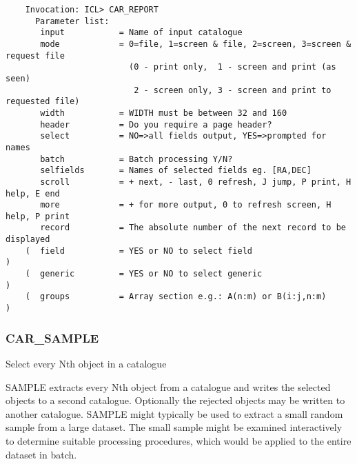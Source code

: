 \begin{verbatim}
    Invocation: ICL> CAR_REPORT
      Parameter list:
       input           = Name of input catalogue
       mode            = 0=file, 1=screen & file, 2=screen, 3=screen & request file
                         (0 - print only,  1 - screen and print (as seen)
                          2 - screen only, 3 - screen and print to requested file)
       width           = WIDTH must be between 32 and 160
       header          = Do you require a page header?
       select          = NO=>all fields output, YES=>prompted for names
       batch           = Batch processing Y/N?
       selfields       = Names of selected fields eg. [RA,DEC]
       scroll          = + next, - last, 0 refresh, J jump, P print, H help, E end
       more            = + for more output, 0 to refresh screen, H help, P print
       record          = The absolute number of the next record to be displayed
    (  field           = YES or NO to select field                               )
    (  generic         = YES or NO to select generic                             )
    (  groups          = Array section e.g.: A(n:m) or B(i:j,n:m)                )
\end{verbatim}

\subsubsection{CAR\_SAMPLE}

Select every Nth object in a catalogue

SAMPLE extracts every Nth object from a catalogue and writes the selected
objects to a second catalogue.
Optionally the rejected objects may be written to another catalogue.
SAMPLE might typically be used to extract a small random sample from a large
dataset.
The small sample might be examined interactively to determine suitable
processing procedures, which would be applied to the entire dataset in batch.

